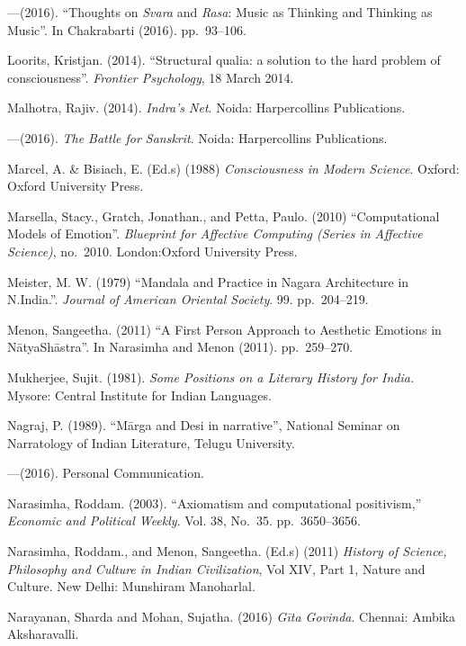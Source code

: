\begin{thebibliography}{99}
---\kern3pt(2016). “Thoughts on \textsl{Svara} and \textsl{Rasa}: Music as Thinking and Thinking as Music”. In Chakrabarti (2016). pp.~93--106.

Loorits, Kristjan. (2014). “Structural qualia: a solution to the hard problem of consciousness”. \textsl{Frontier Psychology}, 18 March 2014.

Malhotra, Rajiv. (2014). \textsl{Indra’s Net}. Noida: Harpercollins Publications.

---\kern3pt(2016). \textsl{The Battle for Sanskrit}. Noida: Harpercollins Publications.

Marcel, A. \& Bisiach, E. (Ed.s) (1988) \textsl{Consciousness in Modern Science}. Oxford: Oxford University Press.

Marsella, Stacy., Gratch, Jonathan., and Petta, Paulo. (2010) “Computational Models of Emotion”. \textsl{Blueprint for Affective Computing (Series in Affective Science)}, no.~2010. London:Oxford University Press.

Meister, M. W. (1979) “Mandala and Practice in Nagara Architecture in N.India.”. \textsl{Journal of American Oriental Society}. 99. pp.~204--219.

Menon, Sangeetha. (2011) “A First Person Approach to Aesthetic Emotions in NātyaShāstra”. In Narasimha and Menon (2011). pp.~259--270.

Mukherjee, Sujit. (1981). \textsl{Some Positions on a Literary History for India.} Mysore: Central Institute for Indian Languages.

Nagraj, P. (1989). “Mārga and Desi in narrative”, National Seminar on Narratology of Indian Literature, Telugu University.

---\kern3pt(2016). Personal Communication.

Narasimha, Roddam. (2003). “Axiomatism and computational positivism,” \textsl{Economic and Political Weekly}. Vol. 38, No.~35. pp.~3650--3656.

Narasimha, Roddam., and Menon, Sangeetha. (Ed.s) (2011) \textsl{History of Science, Philosophy and Culture in Indian Civilization}, Vol XIV, Part 1, Nature and Culture. New Delhi: Munshiram Manoharlal.

Narayanan, Sharda and Mohan, Sujatha. (2016) \textsl{Gīta Govinda}. Chennai: Ambika Aksharavalli.


\end{thebibliography}
